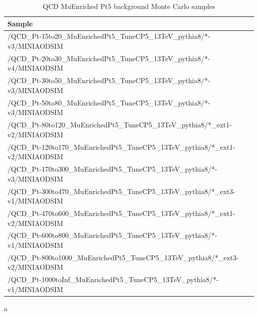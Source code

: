 \begin{table}[htb]
  \caption{QCD MuEnriched Pt5 background Monte Carlo samples}
  \begin{center}
    \footnotesize
    \begin{tabular}{l}\hline
      Sample \\
      \hline
      /QCD\_Pt-15to20\_MuEnrichedPt5\_TuneCP5\_13TeV\_pythia8/*-v3/MINIAODSIM \\
      /QCD\_Pt-20to30\_MuEnrichedPt5\_TuneCP5\_13TeV\_pythia8/*-v4/MINIAODSIM \\
      /QCD\_Pt-30to50\_MuEnrichedPt5\_TuneCP5\_13TeV\_pythia8/*-v3/MINIAODSIM \\
      /QCD\_Pt-50to80\_MuEnrichedPt5\_TuneCP5\_13TeV\_pythia8/*-v3/MINIAODSIM \\
      /QCD\_Pt-80to120\_MuEnrichedPt5\_TuneCP5\_13TeV\_pythia8/*\_ext1-v2/MINIAODSIM \\
      /QCD\_Pt-120to170\_MuEnrichedPt5\_TuneCP5\_13TeV\_pythia8/*\_ext1-v2/MINIAODSIM \\
      /QCD\_Pt-170to300\_MuEnrichedPt5\_TuneCP5\_13TeV\_pythia8/*-v3/MINIAODSIM \\
      /QCD\_Pt-300to470\_MuEnrichedPt5\_TuneCP5\_13TeV\_pythia8/*\_ext3-v1/MINIAODSIM \\
      /QCD\_Pt-470to600\_MuEnrichedPt5\_TuneCP5\_13TeV\_pythia8/*\_ext1-v2/MINIAODSIM \\
      /QCD\_Pt-600to800\_MuEnrichedPt5\_TuneCP5\_13TeV\_pythia8/*-v1/MINIAODSIM \\
      /QCD\_Pt-800to1000\_MuEnrichedPt5\_TuneCP5\_13TeV\_pythia8/*\_ext3-v2/MINIAODSIM \\
      /QCD\_Pt-1000toInf\_MuEnrichedPt5\_TuneCP5\_13TeV\_pythia8/*-v1/MINIAODSIM \\
      \hline
    \end{tabular}
    \label{tab:QCDsample}
  \end{center}
\end{table}
a


